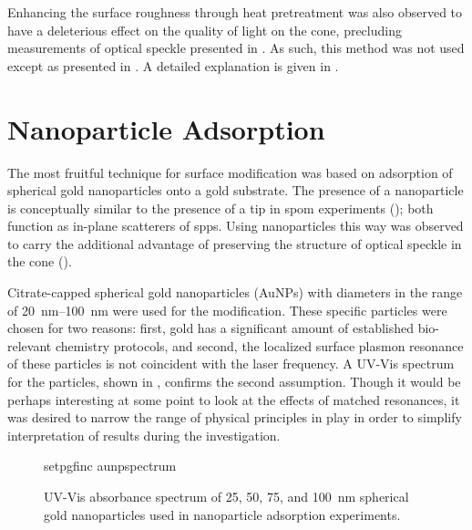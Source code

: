 Enhancing the surface roughness through heat pretreatment was also observed to
have a deleterious effect on the quality of light on the cone, precluding
measurements of optical speckle presented in .  As such,
this method was not used except as presented in .  A
detailed explanation is given in .

\section{Nanoparticle Adsorption}
The most fruitful technique for surface modification was based on adsorption
of spherical gold nanoparticles onto a gold substrate.  The presence of a
nanoparticle is conceptually similar to the presence of a tip in \gls{spom}
experiments (); both function as in-plane scatterers of
\glspl{spp}.  Using nanoparticles this way was observed to carry the additional
advantage of preserving the structure of optical speckle in the cone
().

Citrate-capped spherical gold nanoparticles (AuNPs) with diameters in the
range of \SIrange{20}{100}{\nano\meter} were used for the modification.  These
specific particles were chosen for two reasons: first, gold has a significant
amount of established bio-relevant chemistry protocols, and second, the
localized surface plasmon resonance of these particles is not coincident with
the laser frequency.  A UV-Vis spectrum for the particles, shown in
, confirms the second assumption.  Though it would be
perhaps interesting at some point to look at the effects of matched
resonances, it was desired to narrow the range of physical principles in play
in order to simplify interpretation of results during the investigation.

\begin{figure}[ht]
  \centering
  {setpgfinc}
  {aunpspectrum}
  \caption{UV-Vis absorbance spectrum of 25, 50, 75, and \SI{100}{\nano\meter} spherical gold
    nanoparticles used in nanoparticle adsorption experiments.}
  \label{fig:aunpspectrum}
\end{figure}

